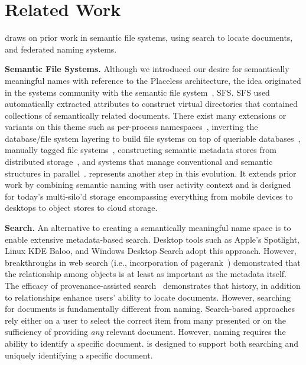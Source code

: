 \section{Related Work}
\label{sec:background}

\system draws on prior work in semantic file systems, using search to locate documents, and federated naming systems.

\noindent\textbf{Semantic File Systems.}
Although we introduced our desire for semantically meaningful names with reference to the Placeless architecture, the idea originated in the systems community with the semantic file system~\cite{giffordSFS}, SFS.
SFS used automatically extracted attributes to construct virtual directories that contained collections of semantically related documents.
There exist many extensions or variants on this theme such as per-process namespaces~\cite{plan9}, inverting the database/file system layering to build file systems on top of queriable databases~\cite{inversion}, 
manually tagged file systems~\cite{tagfs},
constructing semantic metadata stores from distributed storage~\cite{smartstore}, and systems that manage conventional and semantic structures in parallel~\cite{gfs}.
\system represents another step in this evolution.
It extends prior work by combining semantic naming with user activity context and is designed for today's multi-silo'd storage encompassing everything from mobile devices to desktops to object stores to cloud storage.

\noindent\textbf{Search.}
An alternative to creating a semantically meaningful name space is to enable extensive metadata-based search.
Desktop tools such as Apple’s Spotlight, Linux KDE Baloo, and Windows
Desktop Search adopt this approach.
However, breakthroughs in web search (i.e., incorporation of pagerank~\cite{page1999pagerank}) demonstrated that the relationship among objects is at least as important as the metadata itself.
The efficacy of provenance-assisted search~\cite{provsearch,uprove2,pindex} demonstrates that history, in addition to relationships enhance users' ability to locate documents.
However, searching for documents is fundamentally different from naming.
Search-based approaches rely either on a user to select the correct item from many presented or on the sufficiency of providing \emph{any} relevant document.
However, naming requires the ability to identify a specific document. \system is designed to support both searching and uniquely identifying a specific document.

